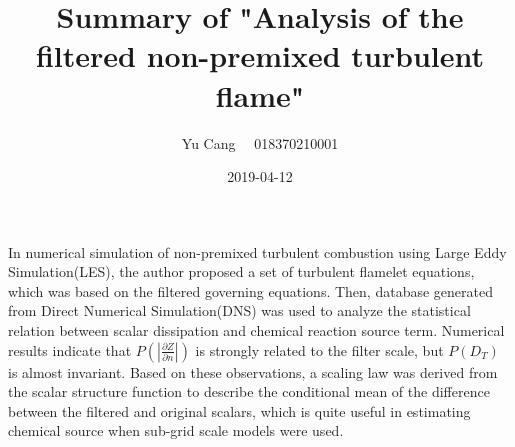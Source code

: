 \documentclass[paper=a4, fontsize=11pt]{scrartcl}
\title{Summary of "Analysis of the filtered non-premixed turbulent flame"}
\author{Yu Cang \ \ 018370210001}
\date{2019-04-12}
\begin{document}
\maketitle
	In numerical simulation of non-premixed turbulent combustion using Large Eddy Simulation(LES), the author proposed a set of turbulent flamelet equations, which was based on the filtered governing equations. Then, database generated from Direct Numerical Simulation(DNS) was used to analyze the statistical relation between scalar dissipation and chemical reaction source term. Numerical results indicate that $P(\left|\frac{\partial Z}{\partial n}\right|)$ is strongly related to the filter scale, but $P(D_T)$ is almost invariant. Based on these observations, a scaling law was derived from the scalar structure function to describe the conditional mean of the difference between the filtered and original scalars, which is quite useful in estimating chemical source when sub-grid scale models were used.
	
\end{document}
